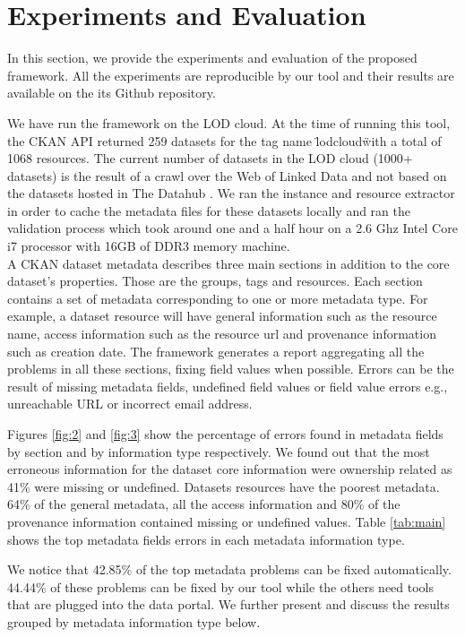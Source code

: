 \documentclass[runningheads,a4paper]{llncs}
\begin{document}
\section{Experiments and Evaluation}
\label{sec:experiment}

In this section, we provide the experiments and evaluation of the proposed framework. All the experiments are reproducible by our tool and their results are available on the its Github repository.

We have run the framework on the LOD cloud. At the time of running this tool, the CKAN API returned 259 datasets for the tag name \"lodcloud\" with a total of 1068 resources. The current number of datasets in the LOD cloud (1000+ datasets) is the result of a crawl over the Web of Linked Data and not based on the datasets hosted in The Datahub \cite{DBLP:conf/semweb/SchmachtenbergBP14}. We ran the instance and resource extractor in order to cache the metadata files for these datasets locally and ran the validation process which took around one and a half hour on a 2.6 Ghz Intel Core i7 processor with 16GB of DDR3 memory machine.\\

A CKAN dataset metadata describes three main sections in addition to the core dataset's properties. Those are the groups, tags and resources. Each section contains a set of metadata corresponding to one or more metadata type. For example, a dataset resource will have general information such as the resource name, access information such as the resource url and provenance information such as creation date. The framework generates a report aggregating all the problems in all these sections, fixing field values when possible. Errors can be the result of missing metadata fields, undefined field values or field value errors e.g., unreachable URL or incorrect email address.

Figures \ref{fig:2} and \ref{fig:3} show the percentage of errors found in metadata fields by section and by information type respectively. We found out that the most erroneous information for the dataset core information were ownership related as 41\% were missing or undefined. Datasets resources have the poorest metadata. 64\% of the general metadata, all the access information and 80\% of the provenance information contained missing or undefined values. Table \ref{tab:main} shows the top metadata fields errors in each metadata information type.

We notice that 42.85\% of the top metadata problems can be fixed automatically. 44.44\% of these problems can be fixed by our tool while the others need tools that are plugged into the data portal. We further present and discuss the results grouped by metadata information type below.
\end{document}
